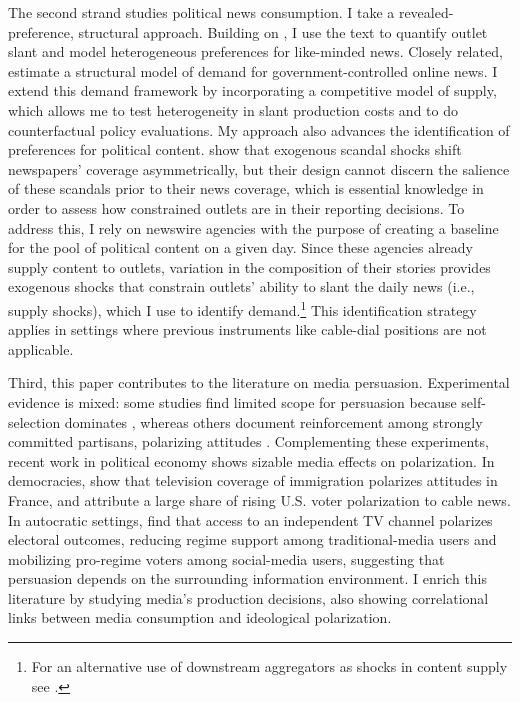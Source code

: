 \documentclass[12pt]{article}
\begin{document}
The second strand studies political news consumption. I take a revealed-preference, structural approach. Building on \citet{gentzkow2010media}, I use the text to quantify outlet slant and model heterogeneous preferences for like-minded news. Closely related, \citet{SimonovRao2022} estimate a structural model of demand for government-controlled online news. I extend this demand framework by incorporating a competitive model of supply, which allows me to test heterogeneity in slant production costs and to do counterfactual policy evaluations. My approach also advances the identification of preferences for political content. \citet{Puglisi2011NewspaperCO} show that exogenous scandal shocks shift  newspapers’ coverage asymmetrically, but their design cannot discern the salience of these scandals prior to their news coverage, which is essential knowledge in order to assess how constrained outlets are in their reporting decisions. To address this, I rely on newswire agencies with the purpose of creating a baseline for the pool of political content on a given day. Since these agencies already supply content to outlets, variation in the composition of their stories provides exogenous shocks that constrain outlets’ ability to slant the daily news (i.e., supply shocks), which I use to identify demand.\footnote{For an alternative use of downstream aggregators as shocks in content supply see \cite{milena}.} This identification strategy applies in settings where previous instruments like cable-dial positions \citep{martin2017} are not applicable.



Third, this paper contributes to the literature on media persuasion. Experimental evidence is mixed: some studies find limited scope for persuasion because self-selection dominates \citep{arceneaux_johnson_2013}, whereas others document reinforcement among strongly committed partisans, polarizing attitudes \citep{levendusky}. Complementing these experiments, recent work in political economy shows sizable media effects on polarization. In democracies, \citet{schneider2025media} show that television coverage of immigration polarizes attitudes in France, and \citet{martin2017} attribute a large share of rising U.S. voter polarization to cable news. In autocratic settings, \citet{enikolopov_tv}  find that access to an independent TV channel polarizes electoral outcomes, reducing regime support among traditional-media users and mobilizing pro-regime voters among social-media users, suggesting that persuasion depends on the surrounding information environment. I enrich this literature by studying media's production decisions, also showing correlational links between media consumption and ideological polarization.
\end{document}

